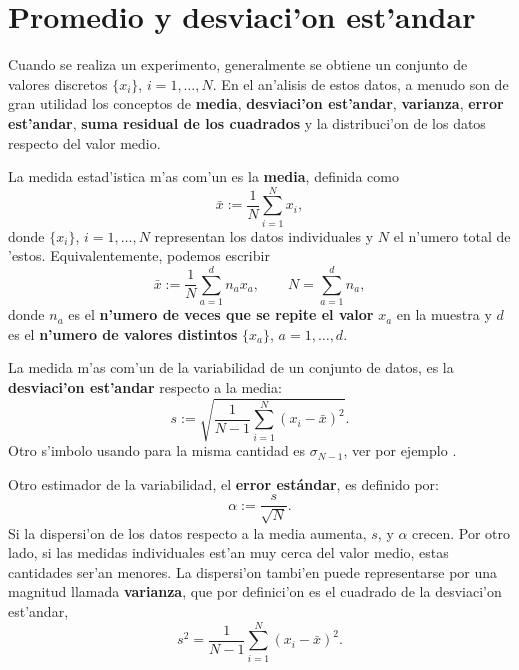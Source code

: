 \documentclass[a4paper]{report}
\begin{document}
\section{Promedio y desviaci'on est'andar}

Cuando se realiza un experimento, generalmente se obtiene un conjunto de valores discretos $\lbrace x_i\rbrace$, $i=1,\dots,N$.  En el an'alisis de estos datos, a menudo son de gran utilidad los conceptos de \textbf{media}, \textbf{desviaci'on est'andar}, \textbf{varianza}, \textbf{error est'andar}, \textbf{suma residual de los cuadrados}  y la distribuci'on de los datos respecto del valor medio. 

La medida estad'istica m'as com'un es la \textbf{media}, definida como
\begin{equation}
\bar{x}:=\frac{1}{N}\sum_{i=1}^N x_i,
\end{equation}
donde $\lbrace x_i\rbrace$, $i=1,\dots,N$ representan los datos individuales y $N$ el n'umero total de 'estos.
Equivalentemente, podemos escribir
\begin{equation}
\bar{x}:=\frac{1}{N}\sum_{a=1}^{d} n_a x_a, \qquad N=\sum_{a=1}^{d} n_a,
\end{equation}
donde $n_a$ es el \textbf{n'umero de veces que se repite el valor} $x_a$ en la muestra y $d$ es el \textbf{n'umero de valores distintos} $\lbrace x_a\rbrace$, $a=1,\dots,d$.
%
%
%

La medida m'as com'un de la variabilidad de un conjunto de datos, es la \textbf{desviaci'on est'andar} respecto a la media:
\begin{equation}
s:=\sqrt{\frac{1}{N-1}\sum_{i=1}^N(x_i-\bar{x})^2}.
\end{equation}
Otro s'imbolo usando para la misma cantidad es $\sigma_{N-1}$, ver por ejemplo \cite{HH2010}.

Otro estimador de la variabilidad, el \textbf{error estándar}, es definido por:
\begin{equation}
\alpha:=\frac{s}{\sqrt{N}}.
\end{equation}
Si la dispersi'on de los datos respecto a la media aumenta, $s$, y $\alpha$ crecen. Por otro lado, si las medidas individuales est'an muy cerca del valor medio, estas cantidades ser'an menores. La dispersi'on tambi'en puede representarse por una magnitud llamada \textbf{varianza}, que por definici'on es el cuadrado de la desviaci'on est'andar,
\begin{equation}
s^2=\frac{1}{N-1}\sum_{i=1}^N(x_i-\bar{x})^2.
\end{equation}
\end{document}
